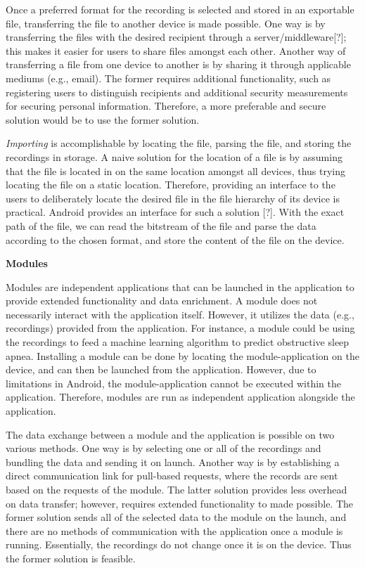 Once a preferred format for the recording is selected and stored in an exportable file, transferring the file to another device is made possible. One way is by transferring the files with the desired recipient through a server/middleware[?]; this makes it easier for users to share files amongst each other. Another way of transferring a file from one device to another is by sharing it through applicable mediums (e.g., email). The former requires additional functionality, such as registering users to distinguish recipients and additional security measurements for securing personal information. Therefore, a more preferable and secure solution would be to use the former solution. 

\textit{Importing} is accomplishable by locating the file, parsing the file, and storing the recordings in storage. A naive solution for the location of a file is by assuming that the file is located in on the same location amongst all devices, thus trying locating the file on a static location. Therefore, providing an interface to the users to deliberately locate the desired file in the file hierarchy of its device is practical. Android provides an interface for such a solution [?]. With the exact path of the file, we can read the bitstream of the file and parse the data according to the chosen format, and store the content of the file on the device.

\noindent \textbf{Modules}

\noindent Modules are independent applications that can be launched in the application to provide extended functionality and data enrichment. A module does not necessarily interact with the application itself. However, it utilizes the data (e.g., recordings) provided from the application. For instance, a module could be using the recordings to feed a machine learning algorithm to predict obstructive sleep apnea. Installing a module can be done by locating the module-application on the device, and can then be launched from the application. However, due to limitations in Android, the module-application cannot be executed within the application. Therefore, modules are run as independent application alongside the application.

The data exchange between a module and the application is possible on two various methods. One way is by selecting one or all of the recordings and bundling the data and sending it on launch. Another way is by establishing a direct communication link for pull-based requests, where the records are sent based on the requests of the module. The latter solution provides less overhead on data transfer; however, requires extended functionality to made possible. The former solution sends all of the selected data to the module on the launch, and there are no methods of communication with the application once a module is running. Essentially, the recordings do not change once it is on the device. Thus the former solution is feasible. 


